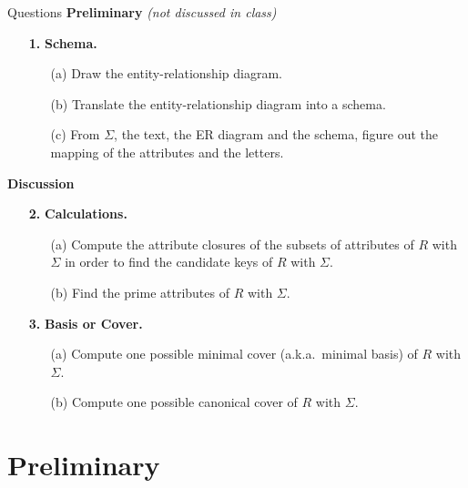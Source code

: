 \documentclass{beamer}
\begin{document}
\begin{frame}{Questions}
\footnotesize
\textbf{Preliminary} \textit{(not discussed in class)}
\begin{enumerate}
  \item[\textbf{1.}] \textbf{Schema.}
  \begin{enumerate}
    \item[(a)] Draw the entity-relationship diagram.
    \item[(b)] Translate the entity-relationship diagram into a schema.
    \item[(c)] From $\Sigma$, the text, the ER diagram and the schema, figure out the mapping of the attributes and the letters.
  \end{enumerate}
\end{enumerate}
\medskip
\textbf{Discussion}
\begin{enumerate}
  \item[\textbf{2.}] \textbf{Calculations.}
  \begin{enumerate}
    \item[(a)] Compute the attribute closures of the subsets of attributes of $R$ with $\Sigma$ in order to find the candidate keys of $R$ with $\Sigma$.
    \item[(b)] Find the prime attributes of $R$ with $\Sigma$.
  \end{enumerate}
  \item[\textbf{3.}] \textbf{Basis or Cover.}
  \begin{enumerate}
    \item[(a)] Compute one possible minimal cover (a.k.a.\ minimal basis) of $R$ with $\Sigma$.
    \item[(b)] Compute one possible canonical cover of $R$ with $\Sigma$.
  \end{enumerate}
\end{enumerate}
\end{frame}

\section{Preliminary}
\end{document}
